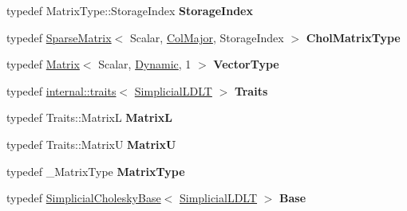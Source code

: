 \begin{DoxyCompactItemize}
\mbox{\label{group___sparse_cholesky___module_a653560f255aa6cf3a3c01bf0cb33efcd}} 
typedef Matrix\+Type\+::\+Storage\+Index {\bfseries Storage\+Index}
\item 
\mbox{\label{group___sparse_cholesky___module_aefb2fe5145c99758a17687e0b46b6984}} 
typedef \hyperlink{group___sparse_core___module_class_eigen_1_1_sparse_matrix}{Sparse\+Matrix}$<$ Scalar, \hyperlink{group__enums_ggaacded1a18ae58b0f554751f6cdf9eb13a0cbd4bdd0abcfc0224c5fcb5e4f6669a}{Col\+Major}, Storage\+Index $>$ {\bfseries Chol\+Matrix\+Type}
\item 
\mbox{\label{group___sparse_cholesky___module_a46600ac1a333de3d432e3aa0a9c6ce4d}} 
typedef \hyperlink{group___core___module_class_eigen_1_1_matrix}{Matrix}$<$ Scalar, \hyperlink{namespace_eigen_ad81fa7195215a0ce30017dfac309f0b2}{Dynamic}, 1 $>$ {\bfseries Vector\+Type}
\item 
\mbox{\label{group___sparse_cholesky___module_adcb202f95627052f2fcec1a443846c47}} 
typedef \hyperlink{struct_eigen_1_1internal_1_1traits}{internal\+::traits}$<$ \hyperlink{group___sparse_cholesky___module_class_eigen_1_1_simplicial_l_d_l_t}{Simplicial\+L\+D\+LT} $>$ {\bfseries Traits}
\item 
\mbox{\label{group___sparse_cholesky___module_acfee89670dd30e7a362daf07993dc34f}} 
typedef Traits\+::\+MatrixL {\bfseries MatrixL}
\item 
\mbox{\label{group___sparse_cholesky___module_a44fd1f38eca9ea9eeba9947466104c18}} 
typedef Traits\+::\+MatrixU {\bfseries MatrixU}
\item 
\mbox{\label{group___sparse_cholesky___module_a75c4a9713dc57cea09c05185a93398b6}} 
typedef \+\_\+\+Matrix\+Type {\bfseries Matrix\+Type}
\item 
\mbox{\label{group___sparse_cholesky___module_a80564e6741d039a3b7b2b71a96639678}} 
typedef \hyperlink{group___sparse_cholesky___module_class_eigen_1_1_simplicial_cholesky_base}{Simplicial\+Cholesky\+Base}$<$ \hyperlink{group___sparse_cholesky___module_class_eigen_1_1_simplicial_l_d_l_t}{Simplicial\+L\+D\+LT} $>$ {\bfseries Base}

\end{DoxyCompactItemize}
